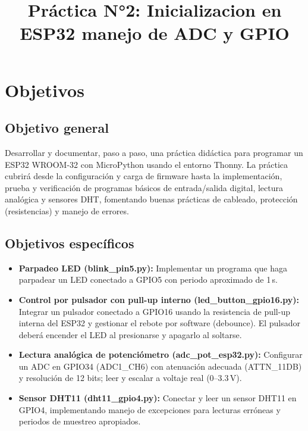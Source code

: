 \documentclass[a4paper,12pt]{article}
\title{Práctica N°2: Inicializacion en ESP32 manejo de ADC y GPIO}
\date{}
\begin{document}
\maketitle
\tableofcontents
\newpage

\section{Objetivos}

\subsection{Objetivo general}
Desarrollar y documentar, paso a paso, una práctica didáctica para programar un ESP32 WROOM-32 con MicroPython usando el entorno Thonny. La práctica cubrirá desde la configuración y carga de firmware hasta la implementación, prueba y verificación de programas básicos de entrada/salida digital, lectura analógica y sensores DHT, fomentando buenas prácticas de cableado, protección (resistencias) y manejo de errores.

\subsection{Objetivos específicos}
\begin{itemize}
  \item \textbf{Parpadeo LED (blink\_pin5.py):} Implementar un programa que haga parpadear un LED conectado a GPIO5 con periodo aproximado de 1\,s. 
  
  \item \textbf{Control por pulsador con pull-up interno (led\_button\_gpio16.py):} Integrar un pulsador conectado a GPIO16 usando la resistencia de pull-up interna del ESP32 y gestionar el rebote por software (debounce). El pulsador deberá encender el LED al presionarse y apagarlo al soltarse. 
  
  \item \textbf{Lectura analógica de potenciómetro (adc\_pot\_esp32.py):} Configurar un ADC en GPIO34 (ADC1\_CH6) con atenuación adecuada (ATTN\_11DB) y resolución de 12 bits; leer y escalar a voltaje real (0--3.3\,V). 
  
  \item \textbf{Sensor DHT11 (dht11\_gpio4.py):} Conectar y leer un sensor DHT11 en GPIO4, implementando manejo de excepciones para lecturas erróneas y periodos de muestreo apropiados.
  
  
\end{itemize}
\end{document}
